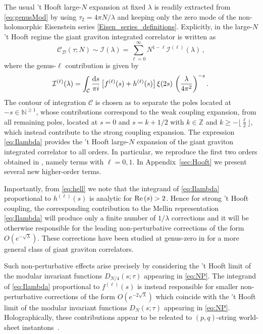 \documentclass[aps,prl,twocolumn, longbibliography,footinbib,superscriptaddress, preprintnumbers]{revtex4-1}
\newcommand{\<}{\langle}
\renewcommand{\>}{\rangle}
\def\Re{{\rm Re \,}}
\begin{document}
The usual ’t Hooft large-$N$ expansion at fixed $\lambda$ is readily extracted from \eqref{eq:genusMod} by using $\tau_2 = 4 \pi  N/\lambda$ and keeping only the zero mode of the non-holomorphic Eisenstein series \eqref{Eisen_series_definitions}.
Explicitly, in the large-$N$ 't Hooft regime the giant graviton integrated correlator is written as
\begin{equation}
\mathcal{C}_{\mathcal{D}}(\tau; N) \sim\mathcal{I}(\lambda) =  \sum_{\ell=0}^\infty N^{1-\ell} \mathcal{I}^{(\ell)}(\lambda)\,,
\end{equation}
where the genus-$\ell$ contribution is given by
\begin{equation} \label{eq:Ilambda}
\! \mathcal{I}^{(\ell)}(\lambda)= \int_{\mathcal{C}}  \frac{{\rm d} s}{\pi i} \, \big[f^{(\ell)}(s) + h^{(\ell)}(s) \big] \, \xi(2s)\, \left( \frac{\lambda}{4\pi^2} \right)^{-s}  .
\end{equation}
The contour of integration $\mathcal{C}$ is chosen as to separate the poles located at $-s\in \mathbb{N}^{\geq 1}$, whose contributions correspond to the weak coupling expansion, from all remaining poles, located at $s=0$ and $s = k+1/2$ with $k\in \mathbb{Z}$ and $k \geq -\lfloor \frac{\ell}{2}\rfloor$, which instead contribute to the strong coupling expansion.
The expression \eqref{eq:Ilambda} provides the 't Hooft large-$N$ expansion of the giant graviton integrated correlator to all orders. In particular, we reproduce the first two orders obtained in \cite{Brown:2024tru}, namely terms with $\ell=0, 1$. In Appendix~\ref{sec:Hooft} we present several new higher-order terms.

Importantly, from \eqref{eq:hell} we note that the integrand of \eqref{eq:Ilambda} proportional to $h^{(\ell)}(s)$ is analytic for ${\Re}(s)>2$. Hence for strong 't Hooft coupling, the corresponding contribution to the Mellin representation \eqref{eq:Ilambda} will produce only a finite number of $1/\lambda$ corrections and it will be otherwise responsible for the leading non-perturbative corrections of the form $O(e^{ - \sqrt{\lambda}})$.
These corrections have been studied at genus-zero in \cite{Brown:2025huy} for a more general class of giant graviton correlators.

 Such non-perturbative effects arise precisely by considering the 't Hooft limit of the modular invariant functions $D_{N/4}(s;\tau)$ appearing in \eqref{eq:NP}.  The integrand of \eqref{eq:Ilambda} proportional to $f^{(\ell)}(s)$ is instead responsible for smaller non-perturbative corrections of the form $O(e^{ - 2\sqrt{\lambda}})$ which coincide with the 't Hooft limit of the modular invariant functions $D_{N}(s;\tau)$ appearing in \eqref{eq:NP}. Holographically, these contributions appear to be releated to $(p, q)$-string world-sheet instantons~\cite{Dorigoni:2022cua}.
\vspace{-0.46cm}
\end{document}
